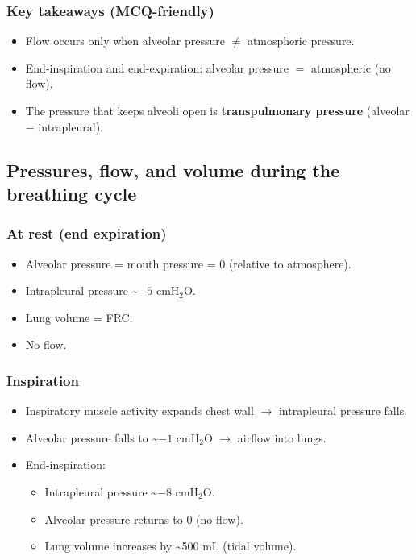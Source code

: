\documentclass[11pt,a4paper]{article}
\begin{document}
\subsubsection{Key takeaways (MCQ-friendly)}
\begin{itemize}[leftmargin=*,nosep]
  \item Flow occurs only when alveolar pressure $\neq$ atmospheric pressure.
  \item End-inspiration and end-expiration: alveolar pressure $=$ atmospheric (no flow).
  \item The pressure that keeps alveoli open is \textbf{transpulmonary pressure} (alveolar $-$ intrapleural).
\end{itemize}

\subsection{Pressures, flow, and volume during the breathing cycle}

\subsubsection{At rest (end expiration)}
\begin{itemize}[leftmargin=*,nosep]
  \item Alveolar pressure = mouth pressure = 0 (relative to atmosphere).
  \item Intrapleural pressure \textasciitilde $-5$ cmH$_2$O.
  \item Lung volume = FRC.
  \item No flow.
\end{itemize}

\subsubsection{Inspiration}
\begin{itemize}[leftmargin=*,nosep]
  \item Inspiratory muscle activity expands chest wall $\rightarrow$ intrapleural pressure falls.
  \item Alveolar pressure falls to \textasciitilde $-1$ cmH$_2$O $\rightarrow$ airflow into lungs.
  \item End-inspiration:
  \begin{itemize}[leftmargin=*,nosep]
    \item Intrapleural pressure \textasciitilde $-8$ cmH$_2$O.
    \item Alveolar pressure returns to 0 (no flow).
    \item Lung volume increases by \textasciitilde 500 mL (tidal volume).
  \end{itemize}
\end{itemize}
\end{document}
